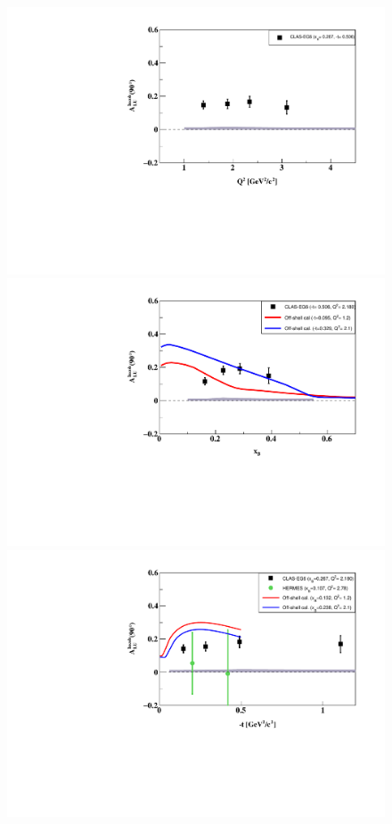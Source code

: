 \begin{figure}[tpb]
   \centering
\includegraphics[scale=0.52]{fig_Dec2016/ALU_90_p_vs_Q2_shortscenrario.pdf}\\ 
\includegraphics[scale=0.52]{fig_Dec2016/ALU_90_p_vs_x_shortscenrario.pdf}\\
\includegraphics[scale=0.52]{fig_Dec2016/ALU_90_p_vs_t_shortscenrario.pdf} \\ 

\end{figure}
